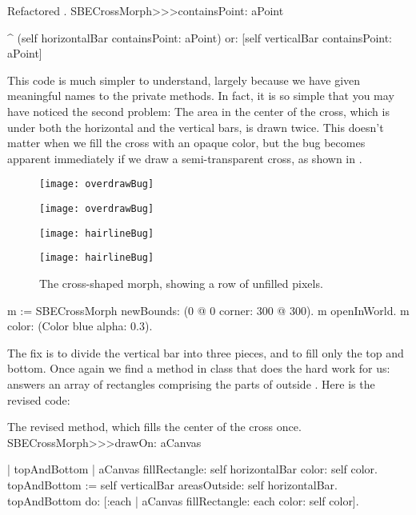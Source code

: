 \documentclass[a4paper,10pt,twoside]{book}
\begin{document}
\begin{method}{Refactored .}
SBECrossMorph>>>containsPoint: aPoint

	^ (self horizontalBar containsPoint: aPoint)
		or: [self verticalBar containsPoint: aPoint]
\end{method}

This code is much simpler to understand, largely because we have given meaningful names to the private methods.
In fact, it is so simple that you may have noticed the second problem:
The area in the center of the cross, which is under both the horizontal and the vertical bars, is drawn twice.
This doesn't matter when we fill the cross with an opaque color, but the bug becomes apparent immediately if we draw a semi-transparent cross, as shown in .

\begin{figure}[t]
\begin{minipage}[t]{0.48\textwidth}
	\ifluluelse
		{\centerline{\texttt{[image: overdrawBug]}}}
		{\centerline{\texttt{[image: overdrawBug]}}}
	\caption{The center of the cross is filled twice with the color.
		\label{fig:overdrawBug}}
\end{minipage}
\hfill
\begin{minipage}[t]{0.48\textwidth}
	\ifluluelse
		{\centerline{\texttt{[image: hairlineBug]}}}
		{\centerline{\texttt{[image: hairlineBug]}}}
	\caption{The cross-shaped morph, showing a row of unfilled pixels.
		\label{fig:bug}}
\end{minipage}
\end{figure}


\begin{code}{}
m := SBECrossMorph newBounds: (0 @ 0 corner: 300 @ 300).
m openInWorld.
m color: (Color blue alpha: 0.3).
\end{code}

\noindent
The fix is to divide the vertical bar into three pieces, and to fill only the top and bottom.
Once again we find a method in class  that does the hard work for us:  answers an array of rectangles comprising the parts of  outside .
Here is the revised code:

\begin{method}{The revised  method, which fills the center of the cross once.}
SBECrossMorph>>>drawOn: aCanvas

	| topAndBottom |
	aCanvas fillRectangle: self horizontalBar color: self color.
	topAndBottom := self verticalBar areasOutside: self horizontalBar.
	topAndBottom do: [:each | aCanvas fillRectangle: each color: self color].
\end{method}
\end{document}
